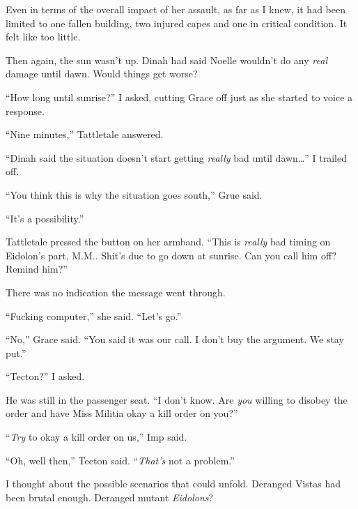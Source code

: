 Even in terms of the overall impact of her assault, as far as I knew, it had been limited to one fallen building, two injured capes and one in critical condition.  It felt like too little.



Then again, the sun wasn't up.  Dinah had said Noelle wouldn't do any \emph{real} damage until dawn.  Would things get worse?



``How long until sunrise?'' I asked, cutting Grace off just as she started to voice a response.



``Nine minutes,'' Tattletale answered.



``Dinah said the situation doesn't start getting \emph{really} bad until dawn\ldots'' I trailed off.



``You think this is why the situation goes south,'' Grue said.



``It's a possibility.''



Tattletale pressed the button on her armband.  ``This is \emph{really} bad timing on Eidolon's part, M.M..  Shit's due to go down at sunrise.  Can you call him off?  Remind him?''



There was no indication the message went through.



``Fucking computer,'' she said.  ``Let's go.''



``No,'' Grace said.  ``You said it was our call.  I don't buy the argument.  We stay put.''



``Tecton?'' I asked.



He was still in the passenger seat.  ``I don't know.  Are \emph{you} willing to disobey the order and have Miss Militia okay a kill order on you?''



``\emph{Try} to okay a kill order on us,'' Imp said.



``Oh, well then,'' Tecton said.  ``\emph{That's} not a problem.''



I thought about the possible scenarios that could unfold.  Deranged Vistas had been brutal enough.  Deranged mutant \emph{Eidolons}?



